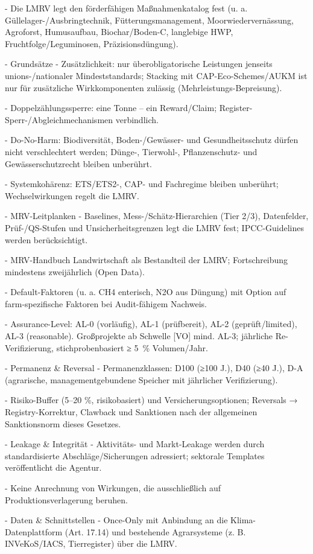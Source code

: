 \documentclass[12pt,a4paper]{scrartcl}
\begin{document}
- Die LMRV legt den förderfähigen Maßnahmenkatalog fest (u. a. Güllelager-/Ausbringtechnik, Fütterungsmanagement, Moorwiedervernässung, Agroforst, Humusaufbau, Biochar/Boden-C, langlebige HWP, Fruchtfolge/Leguminosen, Präzisionsdüngung).

- Grundsätze
- Zusätzlichkeit: nur überobligatorische Leistungen jenseits unions-/nationaler Mindeststandards; Stacking mit CAP-Eco-Schemes/AUKM ist nur für zusätzliche Wirkkomponenten zulässig (Mehrleistungs-Bepreisung).

- Doppelzählungssperre: eine Tonne -- ein Reward/Claim; Register-Sperr-/Abgleichmechanismen verbindlich.

- Do-No-Harm: Biodiversität, Boden-/Gewässer- und Gesundheitsschutz dürfen nicht verschlechtert werden; Dünge-, Tierwohl-, Pflanzenschutz- und Gewässerschutzrecht bleiben unberührt.

- Systemkohärenz: ETS/ETS2-, CAP- und Fachregime bleiben unberührt; Wechselwirkungen regelt die LMRV.

- MRV-Leitplanken
- Baselines, Mess-/Schätz-Hierarchien (Tier 2/3), Datenfelder, Prüf-/QS-Stufen und Unsicherheitsgrenzen legt die LMRV fest; IPCC-Guidelines werden berücksichtigt.

- MRV-Handbuch Landwirtschaft als Bestandteil der LMRV; Fortschreibung mindestens zweijährlich (Open Data).

- Default-Faktoren (u. a. CH4 enterisch, N2O aus Düngung) mit Option auf farm-spezifische Faktoren bei Audit-fähigem Nachweis.

- Assurance-Level: AL-0 (vorläufig), AL-1 (prüfbereit), AL-2 (geprüft/limited), AL-3 (reasonable). Großprojekte ab Schwelle [VO] mind. AL-3; jährliche Re-Verifizierung, stichprobenbasiert ≥ 5 \% Volumen/Jahr.

- Permanenz \& Reversal
- Permanenzklassen: D100 (≥100 J.), D40 (≥40 J.), D-A (agrarische, managementgebundene Speicher mit jährlicher Verifizierung).

- Risiko-Buffer (5--20 \%, risikobasiert) und Versicherungsoptionen; Reversals → Registry-Korrektur, Clawback und Sanktionen nach der allgemeinen Sanktionsnorm dieses Gesetzes.

- Leakage \& Integrität
- Aktivitäts- und Markt-Leakage werden durch standardisierte Abschläge/Sicherungen adressiert; sektorale Templates veröffentlicht die Agentur.

- Keine Anrechnung von Wirkungen, die ausschließlich auf Produktionsverlagerung beruhen.

- Daten \& Schnittstellen
- Once-Only mit Anbindung an die Klima-Datenplattform (Art. 17.14) und bestehende Agrarsysteme (z. B. INVeKoS/IACS, Tierregister) über die LMRV.
\end{document}

